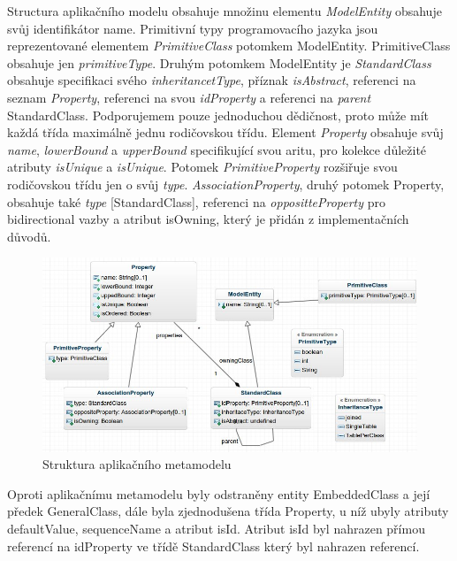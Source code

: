 \documentclass[11pt,twoside,a4paper]{book}
\begin{document}
Structura aplikačního modelu obsahuje množinu elementu \textit{ModelEntity}
obsahuje svůj identifikátor name. Primitivní typy programovacího jazyka jsou
reprezentované elementem \textit{PrimitiveClass} potomkem ModelEntity. 
PrimitiveClass obsahuje jen \textit{primitiveType}. Druhým potomkem ModelEntity
je \textit{StandardClass} obsahuje specifikaci svého \textit{inheritancetType}, příznak
\textit{isAbstract}, referenci na seznam \textit{Property}, referenci na
svou \textit{idProperty} a referenci na \textit{parent} StandardClass.
Podporujemem pouze jednoduchou dědičnost, proto může mít každá třída maximálně 
jednu rodičovskou třídu. Element \textit{Property} obsahuje svůj \textit{name},
\textit{lowerBound} a \textit{upperBound} specifikující svou aritu, pro kolekce
důležité atributy \textit{isUnique} a \textit{isUnique}. Potomek
\textit{PrimitiveProperty} rozšiřuje svou rodičovskou třídu jen o svůj
\textit{type}.
\textit{AssociationProperty}, druhý potomek Property, obsahuje také
\textit{type} [StandardClass], referenci na \textit{oppositteProperty} pro
bidirectional vazby a atribut isOwning, který je přidán z implementačních
důvodů. \\

\begin{figure}[h]
\begin{center}
\includegraphics[width=15cm]{figures/app_meta}
\caption{Struktura aplikačního metamodelu}
\label{fig:app_meta}
\end{center}
\end{figure}

\FloatBarrier
Oproti aplikačnímu metamodelu \cite{Jezek} byly odstraněny entity EmbeddedClass 
a její předek GeneralClass, dále byla zjednodušena třída Property, u níž ubyly
atributy defaultValue, sequenceName a atribut isId. Atribut isId byl nahrazen
přímou referencí na idProperty ve třídě StandardClass který byl nahrazen 
referencí.
\end{document}
